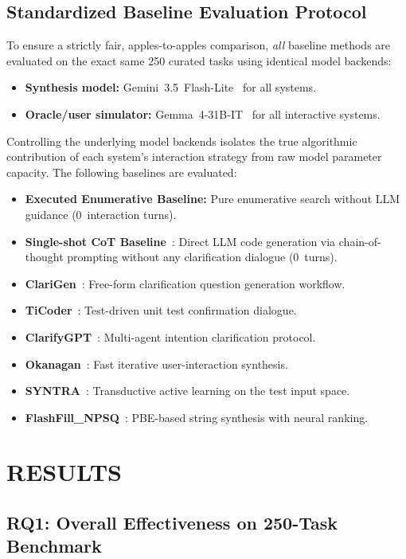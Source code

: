 \documentclass[10pt,conference]{IEEEtran}
\begin{document}
\subsection{Standardized Baseline Evaluation Protocol}
To ensure a strictly fair, apples-to-apples comparison, \textit{all} baseline methods are evaluated on the exact same 250 curated tasks using identical model backends:
\begin{itemize}
  \item \textbf{Synthesis model:} Gemini~3.5~Flash-Lite~\cite{geminiteam} for all systems.
  \item \textbf{Oracle/user simulator:} Gemma~4-31B-IT~\cite{gemma4} for all interactive systems.
\end{itemize}
Controlling the underlying model backends isolates the true algorithmic contribution of each system's interaction strategy from raw model parameter capacity. The following baselines are evaluated:
\begin{itemize}
  \item \textbf{Executed Enumerative Baseline:} Pure enumerative search without LLM guidance (0~interaction turns).
  \item \textbf{Single-shot CoT Baseline}~\cite{gpt4}: Direct LLM code generation via chain-of-thought prompting without any clarification dialogue (0~turns).
  \item \textbf{ClariGen}~\cite{clarigen}: Free-form clarification question generation workflow.
  \item \textbf{TiCoder}~\cite{ticoder}: Test-driven unit test confirmation dialogue.
  \item \textbf{ClarifyGPT}~\cite{clarifygpt}: Multi-agent intention clarification protocol.
  \item \textbf{Okanagan}~\cite{chen2023}: Fast iterative user-interaction synthesis.
  \item \textbf{SYNTRA}~\cite{syntra}: Transductive active learning on the test input space.
  \item \textbf{FlashFill\_NPSQ}~\cite{flashfill, npsq}: PBE-based string synthesis with neural ranking.
\end{itemize}

\section{RESULTS}\label{sec:results}

\subsection{RQ1: Overall Effectiveness on 250-Task Benchmark}
\end{document}
